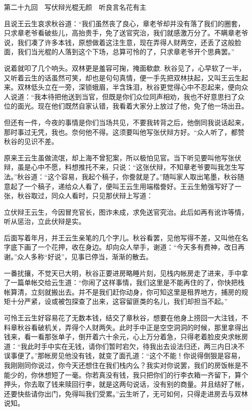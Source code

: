 \documentclass[12pt,UTF8]{ctexbook}
\begin{document}
{{{第二十九回　写伏辩光棍无颜　听良言名花有主





且说王云生哀求秋谷道：“我们虽然丧了良心，章老爷却并没有落了我们的圈套，只求章老爷看破些儿，高抬贵手，免了送官究治，我们就感激万分了。不瞒章老爷说，我们凑了许多本钱，原想做着这注生意，现在弄得人财两空，还丢了这般脸面，我们当光棍的人落到这个下场，总算可怜的了，只求章老爷开个思典罢。”

说着就叩了几个响头。双林更是羞容可掬，掩面欷歔. 秋谷见了，心早软了一半，又听着云生的话虽然可笑，却也是句句真情，便一手先把双林扶起，又叫王云生起来。双林低头立在一旁，深锁蛾眉，半含珠泪，秋谷更觉得心中不忍起来，便向众人说道：“我本待把他送到当官，但既是你们众位同声相劝，我也不好意思扫了众位的面光。现在他们既然自家认错，我看着大家分上放过了他，免了他一场出丑。

但还有一件，今夜的事情是你们当场共见，不要我转背之后，他倒同我说话起来，那时事过无凭，我也。奈何他不得。这须要叫他写张伏辩方好。“众人听了，都赞秋谷的见识不差。

原来王云生虽做流氓，却上海不曾犯案，所以极怕见官。当下听见要叫他写张伏辩，虽是心中不愿，料想推托不来，只说：“这张伏辩，不知章老爷要叫我怎生写法。”秋谷道：“这个容易，我起个稿子，你誊就是了。”随叫家人取出笔墨，秋谷随意起了一个稿子，递给众人看了，便叫王云生用端楷誊好。王云生勉强写好了一张，秋谷取过，同众人看时，只见那伏辩上写道：

立伏辩王云生，今因冒充官长，图诈未成，求免送官究治。此后如再有讹诈等情，听从惩治，立此伏辩是实。

后面写着年月，并王云生亲笔的几个字儿。秋谷看罢，见他写得不差，又叫他在名字底下画了一个花押，收在身边。却向众人举手，谢道：“今天多有费神，改日再谢。”众人多称“好说”，见事已停当，渐渐的散去。

一番扰攘，不觉天已大明，秋谷正要进房略睡片刻，见栈内帐房走了进来，手中拿了一篇单帐交给云生道：“你闹了这样事情，我们这里是不能再住的了，你快把栈帐算清，立刻就搬出去。并不是我们赶你动身，你可知这里是租界地方，捕房的规矩十分严紧，设或被包探查了出来，这容留匪类的名儿，我们却担当不起。”

可怜王云生好容易花了无数本钱，结交了章秋谷，想要在他身上捞回一大注钱，不料章秋谷看破机关，弄得个人财两失。此时手中正是空空洞洞的时候，那里拿得出钱来，看一看那张单子，倒开着六十余元，心上万分着急，只得老着脸皮央求帐房道：“我此时手中实在无钱，请你们暂时宕欠，待我出去设法归还，两三内日决不误事便了。”那帐房见他没有钱，就变了面孔道：“这个不能！你说得倒狠是容易，我刚刚同你说过，你今天还想住在我们栈内么？我实对你说罢，我们的房饭帐是不能少的，你休想短了一毫。你若真没有钱，我只把你们的行李衣箱一齐留下，算个押头，你去取了钱来赎回行李，就是这两句说话，没有别的商量。并且结好了帐，还要快些请你出门，免得叫我们受累。”云生听了，无可如何，只得走进房去与双林说知。

}}}
\end{document}

